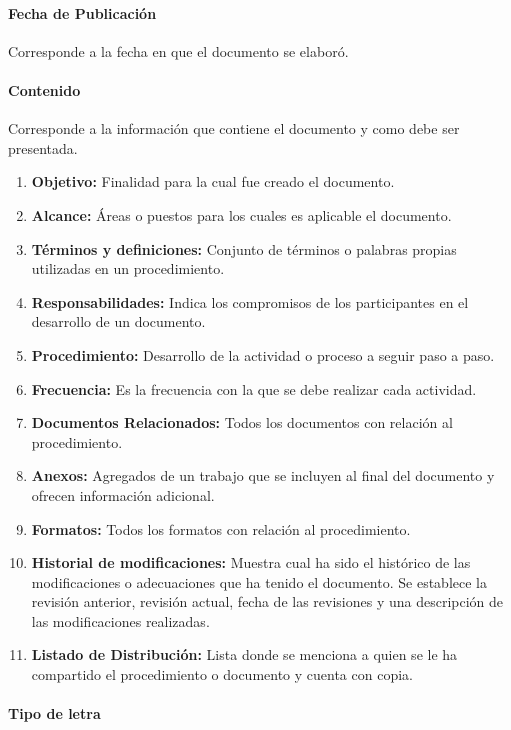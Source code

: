 \paragraph{Fecha de Publicación}

Corresponde a la fecha en que el documento se elaboró.

\paragraph{Contenido}

Corresponde a la información que contiene el documento y como debe ser presentada.

\begin{enumerate}
	\item \textbf{Objetivo:} Finalidad para la cual fue creado el documento.
	\item \textbf{Alcance:} Áreas o puestos para los cuales es aplicable el documento.
	\item \textbf{Términos y definiciones:} Conjunto de términos o palabras propias utilizadas en un procedimiento.
	\item \textbf{Responsabilidades:} Indica los compromisos de los participantes en el desarrollo de un documento.
	\item \textbf{Procedimiento:} Desarrollo de la actividad o proceso a seguir paso a paso.
	\item \textbf{Frecuencia:} Es la frecuencia con la que se debe realizar cada actividad.
	\item \textbf{Documentos Relacionados:} Todos los documentos con relación al procedimiento.
	\item \textbf{Anexos:} Agregados de un trabajo que se incluyen al final del documento y ofrecen información adicional.
	\item \textbf{Formatos:} Todos los formatos con relación al procedimiento.
	\item \textbf{Historial de modificaciones:} Muestra cual ha sido el histórico de las modificaciones o adecuaciones que ha tenido el documento. Se establece la revisión anterior, revisión actual, fecha de las revisiones y una descripción de las modificaciones realizadas.
	\item \textbf{Listado de Distribución:} Lista donde se menciona a quien se le ha compartido el procedimiento o documento y cuenta con copia.
\end{enumerate}

\paragraph{Tipo de letra}


